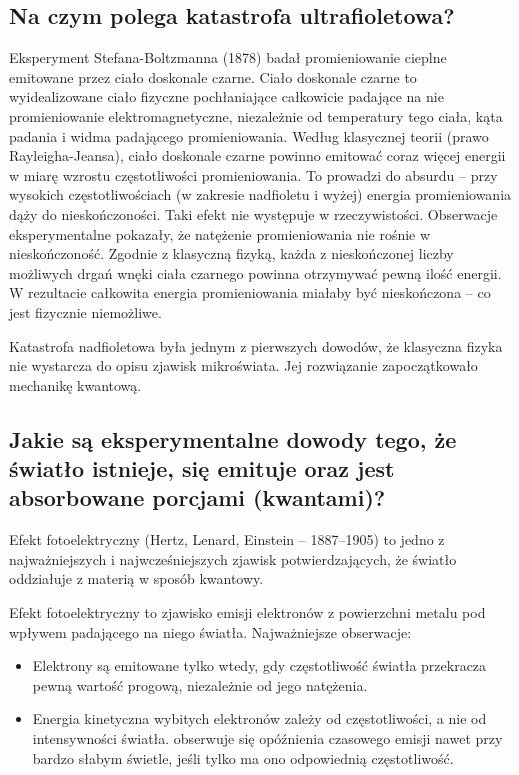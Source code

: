 \subsection{Na czym polega katastrofa ultrafioletowa?}

Eksperyment Stefana-Boltzmanna (1878) badał promieniowanie cieplne emitowane przez
ciało doskonale czarne. Ciało doskonale czarne to wyidealizowane ciało fizyczne pochłaniające całkowicie padające na nie promieniowanie elektromagnetyczne, niezależnie od temperatury tego ciała, kąta padania i widma padającego promieniowania. Według klasycznej teorii (prawo Rayleigha-Jeansa), ciało doskonale czarne powinno emitować coraz więcej energii w miarę wzrostu częstotliwości promieniowania. To prowadzi do absurdu – przy wysokich częstotliwościach (w zakresie nadfioletu i wyżej) energia promieniowania dąży do nieskończoności. Taki efekt nie występuje w rzeczywistości. Obserwacje eksperymentalne pokazały, że natężenie promieniowania nie rośnie w nieskończoność. Zgodnie z klasyczną fizyką, każda z nieskończonej liczby możliwych drgań wnęki ciała czarnego powinna otrzymywać pewną ilość energii. W rezultacie całkowita energia promieniowania miałaby być nieskończona – co jest fizycznie niemożliwe.

Katastrofa nadfioletowa była jednym z pierwszych dowodów, że klasyczna fizyka nie wystarcza do opisu zjawisk mikroświata. Jej rozwiązanie zapoczątkowało mechanikę kwantową.

\subsection{Jakie są eksperymentalne dowody tego, że światło istnieje, się emituje oraz jest absorbowane porcjami (kwantami)?}

Efekt fotoelektryczny (Hertz, Lenard, Einstein – 1887–1905) to jedno z najważniejszych i najwcześniejszych zjawisk potwierdzających, że światło oddziałuje z materią w sposób kwantowy. 

Efekt fotoelektryczny to zjawisko emisji elektronów z powierzchni metalu pod wpływem padającego na niego światła. Najważniejsze obserwacje:
\begin{itemize}
\item Elektrony są emitowane tylko wtedy, gdy częstotliwość światła przekracza pewną wartość progową, niezależnie od jego natężenia. 
\item Energia kinetyczna wybitych elektronów zależy od częstotliwości, a nie od intensywności światła.
\itemNie obserwuje się opóźnienia czasowego emisji nawet przy bardzo słabym świetle, jeśli tylko ma ono odpowiednią częstotliwość.
\end{itemize}

